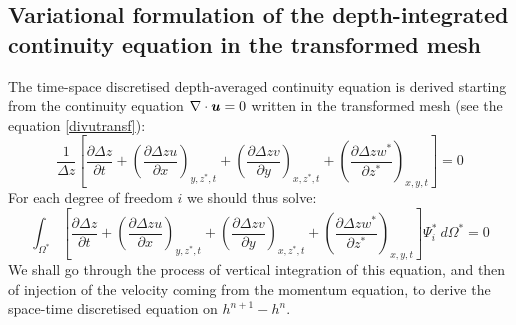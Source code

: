 \subsection{\label{continuitytransformed}Variational formulation of the depth-integrated continuity equation in the transformed mesh}

The time-space discretised depth-averaged continuity equation is derived starting from the
continuity equation $\nabla \cdot \bm{u}=0$ written in the transformed mesh
(see the equation \ref{divutransf}):
\begin{equation}
\dfrac{1}{\Delta z}\left[  \dfrac{\partial\Delta z}{\partial t}+\left(
\dfrac{\partial  \Delta z u  }{\partial x}\right)_{y,z^{\ast},t}
+\left(\dfrac{\partial \Delta z v }{\partial y}\right)_{x,z^{\ast},t}
+\left(\dfrac{\partial\Delta z w^{\ast}}{\partial z^{\ast}}\right)_{x,y,t}\right]
=0 \label{continuiteparplan}
\end{equation}
For each degree of freedom $i$ we should thus solve:
\begin{equation}
\displaystyle{\int_{\Omega^{\ast}}}\left[  \dfrac{\partial\Delta z}{\partial t}+\left(
\dfrac{\partial\Delta z u}{\partial x}\right)_{y,z^{\ast},t}+\left(
\dfrac{\partial\Delta z v}{\partial y}\right)_{x,z^{\ast},t}+\left(
\dfrac{\partial\Delta z w^{\ast}}{\partial z^{\ast}}\right)_{x,y,t}\right]
\Psi_{i}^{\ast}~d\Omega^{\ast}=0
\end{equation}
We shall go through the process of vertical integration of this equation, and then
of injection of the velocity coming from the momentum equation, to derive
the space-time discretised equation on $h^{n+1}-h^{n}$.
